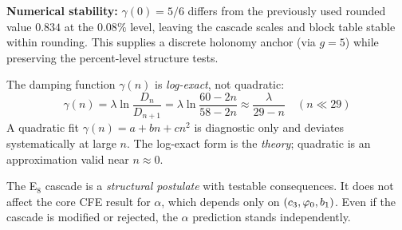 \begin{remark}
\textbf{Numerical stability:} $\gamma(0)=5/6$ differs from the previously used rounded value $0.834$ at the $0.08\%$ level, leaving the cascade scales and block table stable within rounding. 
This supplies a discrete holonomy anchor (via $g=5$) while preserving the percent-level structure tests.
\end{remark}

\begin{tcolorbox}[colback=blue!3, colframe=blue!40, 
    title={\textbf{Lemma (Log-Exact vs.\ Quadratic)}}, fonttitle=\bfseries\small]
The damping function $\gamma(n)$ is \emph{log-exact}, not quadratic:
\begin{equation}
    \gamma(n) = \lambda \ln\frac{D_n}{D_{n+1}} = \lambda \ln\frac{60-2n}{58-2n} 
    \approx \frac{\lambda}{29-n} \quad (n \ll 29)
\end{equation}
A quadratic fit $\gamma(n) = a + bn + cn^2$ is diagnostic only and deviates 
systematically at large $n$. The log-exact form is the \emph{theory}; quadratic 
is an approximation valid near $n \approx 0$.
\end{tcolorbox}

\begin{remark}
The E$_8$ cascade is a \emph{structural postulate} with testable consequences. 
It does not affect the core CFE result for $\alpha$, which depends only on 
$(c_3, \varphi_0, b_1)$. Even if the cascade is modified or rejected, the 
$\alpha$ prediction stands independently.
\end{remark}

